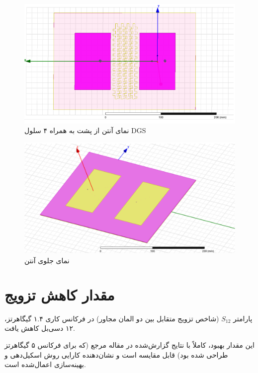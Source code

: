  \begin{figure}
 	\centering
 	\includegraphics[scale=0.5]{Images/fig29.png}
 	\caption{نمای آنتن از پشت به همراه ۴ سلول DGS}
 	\label{fig29}
 \end{figure}
 
  \begin{figure}
 	\centering
 	\includegraphics[scale=0.3]{Images/fig30.png}
 	\caption{نمای جلوی آنتن}
 	\label{fig30}
 \end{figure}
 
 
 \section{مقدار کاهش تزویج}
 
 پارامتر
 $S_{12}$
   (شاخص تزویج متقابل بین دو المان مجاور) در فرکانس کاری ۱.۴ گیگاهرتز، ۱۲ دسی‌بل کاهش یافت.
   
   
 این مقدار بهبود، کاملاً با نتایج گزارش‌شده در مقاله مرجع
 \cite{hajilou2012mutual}
 (که برای فرکانس ۵ گیگاهرتز طراحی شده بود) قابل مقایسه است و نشان‌دهنده کارایی روش اسکیل‌دهی و بهینه‌سازی اعمال‌شده است.
 

